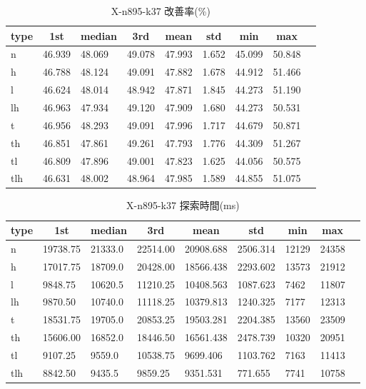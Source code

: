 \begin{table}[htbp]
    \centering
    \caption{X-n895-k37 改善率(\%)}
    \begin{tabular}{|l|l|l|l|l|l|l|l|l|}\hline
    \multicolumn{1}{|c|}{\textbf{type}}
    &\multicolumn{1}{|c|}{\textbf{1st}}
    &\multicolumn{1}{c|}{\textbf{median}}
    &\multicolumn{1}{c|}{\textbf{3rd}}
    &\multicolumn{1}{c|}{\textbf{mean}}
    &\multicolumn{1}{c|}{\textbf{std}}
    &\multicolumn{1}{c|}{\textbf{min}}
    &\multicolumn{1}{c|}{\textbf{max}}\\\hline
	n & 46.939 & 48.069 & 49.078 & 47.993 & 1.652 & 45.099 & 50.848\\\hline
	h & 46.788 & 48.124 & 49.091 & 47.882 & 1.678 & 44.912 & 51.466\\\hline
	l & 46.624 & 48.014 & 48.942 & 47.871 & 1.845 & 44.273 & 51.190\\\hline
	lh & 46.963 & 47.934 & 49.120 & 47.909 & 1.680 & 44.273 & 50.531\\\hline
	t & 46.956 & 48.293 & 49.091 & 47.996 & 1.717 & 44.679 & 50.871\\\hline
	th & 46.851 & 47.861 & 49.261 & 47.793 & 1.776 & 44.309 & 51.267\\\hline
	tl & 46.809 & 47.896 & 49.001 & 47.823 & 1.625 & 44.056 & 50.575\\\hline
	tlh & 46.631 & 48.002 & 48.964 & 47.985 & 1.589 & 44.855 & 51.075\\\hline
	\end{tabular}
\end{table}
\begin{table}[htbp]
    \centering
    \caption{X-n895-k37 探索時間(ms)}
    \begin{tabular}{|l|l|l|l|l|l|l|l|l|}\hline
    \multicolumn{1}{|c|}{\textbf{type}}
    &\multicolumn{1}{|c|}{\textbf{1st}}
    &\multicolumn{1}{c|}{\textbf{median}}
    &\multicolumn{1}{c|}{\textbf{3rd}}
    &\multicolumn{1}{c|}{\textbf{mean}}
    &\multicolumn{1}{c|}{\textbf{std}}
    &\multicolumn{1}{c|}{\textbf{min}}
    &\multicolumn{1}{c|}{\textbf{max}}\\\hline
	n & 19738.75 & 21333.0 & 22514.00 & 20908.688 & 2506.314 & 12129 & 24358\\\hline
	h & 17017.75 & 18709.0 & 20428.00 & 18566.438 & 2293.602 & 13573 & 21912\\\hline
	l & 9848.75 & 10620.5 & 11210.25 & 10408.563 & 1087.623 & 7462 & 11807\\\hline
	lh & 9870.50 & 10740.0 & 11118.25 & 10379.813 & 1240.325 & 7177 & 12313\\\hline
	t & 18531.75 & 19705.0 & 20853.25 & 19503.281 & 2204.385 & 13560 & 23509\\\hline
	th & 15606.00 & 16852.0 & 18446.50 & 16561.438 & 2478.739 & 10320 & 20951\\\hline
	tl & 9107.25 & 9559.0 & 10538.75 & 9699.406 & 1103.762 & 7163 & 11413\\\hline
	tlh & 8842.50 & 9435.5 & 9859.25 & 9351.531 & 771.655 & 7741 & 10758\\\hline
	\end{tabular}
\end{table}
